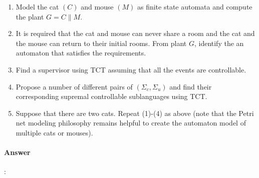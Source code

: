 \documentclass{article}
\begin{document}
\begin{enumerate}
  \item Model the cat $(C)$ and mouse $(M)$ as finite state automata and compute the plant $G=C \| M$.
  \item It is required that the cat and mouse can never share a room and the cat and the mouse can return to their initial rooms. From plant $G$, identify the an automaton that satisfies the requirements.
  \item Find a supervisor using TCT assuming that all the events are controllable.
  \item Propose a number of different pairs of $\left(\Sigma_c, \Sigma_u\right)$ and find their corresponding supremal controllable sublanguages using TCT.
  \item Suppose that there are two cats. Repeat (1)-(4) as above (note that the Petri net modeling philosophy remains helpful to create the automaton model of multiple cats or mouses).
\end{enumerate}

\paragraph{Answer}:
\end{document}
